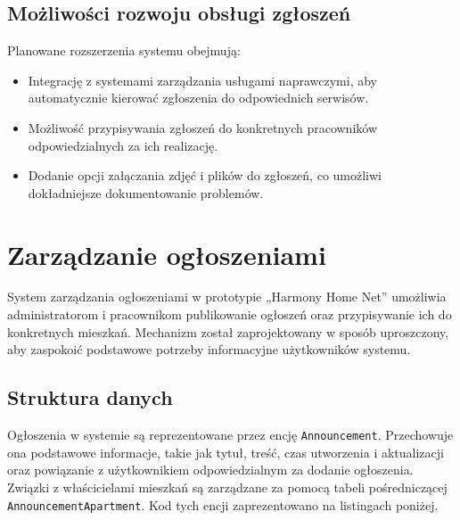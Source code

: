 \subsection{Możliwości rozwoju obsługi zgłoszeń}
Planowane rozszerzenia systemu obejmują:
\begin{itemize}
    \item Integrację z systemami zarządzania usługami naprawczymi, aby automatycznie kierować zgłoszenia do odpowiednich serwisów.
    \item Możliwość przypisywania zgłoszeń do konkretnych pracowników odpowiedzialnych za ich realizację.
    \item Dodanie opcji załączania zdjęć i plików do zgłoszeń, co umożliwi dokładniejsze dokumentowanie problemów.
\end{itemize}

\section{Zarządzanie ogłoszeniami}

System zarządzania ogłoszeniami w prototypie „Harmony Home Net” umożliwia administratorom i pracownikom publikowanie ogłoszeń oraz przypisywanie ich do konkretnych mieszkań. Mechanizm został zaprojektowany w sposób uproszczony, aby zaspokoić podstawowe potrzeby informacyjne użytkowników systemu.

\subsection{Struktura danych}

Ogłoszenia w systemie są reprezentowane przez encję \texttt{Announcement}. Przechowuje ona podstawowe informacje, takie jak tytuł, treść, czas utworzenia i aktualizacji oraz powiązanie z użytkownikiem odpowiedzialnym za dodanie ogłoszenia. Związki z właścicielami mieszkań są zarządzane za pomocą tabeli pośredniczącej \texttt{AnnouncementApartment}. Kod tych encji zaprezentowano na listingach poniżej.


